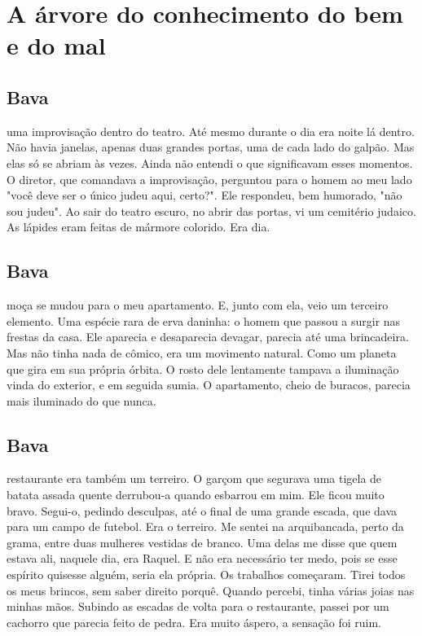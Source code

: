 \part{A árvore do conhecimento do bem e do mal}

\chapter*{Bava \smallskip{}}

 uma improvisação dentro do teatro. Até mesmo durante o dia era noite lá dentro. Não havia janelas, apenas duas grandes portas, uma de cada lado do galpão. Mas elas só se abriam às vezes. Ainda não entendi o que significavam esses momentos. O diretor, que comandava a improvisação, perguntou para o homem ao meu lado "você deve ser o único judeu aqui, certo?". Ele respondeu, bem humorado, "não sou judeu". Ao sair do teatro escuro, no abrir das portas, vi um cemitério judaico. As lápides eram feitas de mármore colorido. Era dia.

\chapter*{Bava \smallskip{}}

 moça se mudou para o meu apartamento. E, junto com ela, veio um terceiro elemento. Uma espécie rara de erva daninha: o homem que passou a surgir nas frestas da casa. Ele aparecia e desaparecia devagar, parecia até uma brincadeira. Mas não tinha nada de cômico, era um movimento natural. Como um planeta que gira em sua própria órbita. O rosto dele lentamente tampava a iluminação vinda do exterior, e em seguida sumia. O apartamento, cheio de buracos, parecia mais iluminado do que nunca.

\chapter*{Bava \smallskip{}}

 restaurante era também um terreiro. O garçom que segurava uma tigela de batata assada quente derrubou-a quando esbarrou em mim. Ele ficou muito bravo. Segui-o, pedindo desculpas, até o final de uma grande escada, que dava para um campo de futebol. Era o terreiro. Me sentei na arquibancada, perto da grama, entre duas mulheres vestidas de branco. Uma delas me disse que quem estava ali, naquele dia, era Raquel. E não era necessário ter medo, pois se esse espírito quisesse alguém, seria ela própria. Os trabalhos começaram. Tirei todos os meus brincos, sem saber direito porquê. Quando percebi, tinha várias joias nas minhas mãos. Subindo as escadas de volta para o restaurante, passei por um cachorro que parecia feito de pedra. Era muito áspero, a sensação foi ruim.

